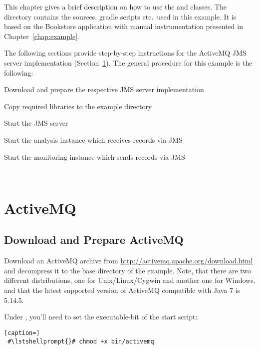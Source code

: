 This chapter gives a brief description on how to use the  and  %
classes. The directory \dir{\JMSBookstoreApplicationReleaseDirDistro/} contains the %
sources, gradle scripts etc.\ used in this example. It is based on the Bookstore %
application with manual instrumentation presented in Chapter~\ref{chap:example}. %

The following sections provide step-by-step instructions for the %
ActiveMQ JMS server implementation (Section~\ref{example:jms:activemq}).
The general procedure for this example is the following:

\medskip

\begin{compactenum}
 \item Download and prepare the respective JMS server implementation
 \item Copy required libraries to the example directory
 \item Start the JMS server
 \item Start the analysis instance which receives records via JMS
 \item Start the monitoring instance which sends records via JMS
\end{compactenum}

\


\section{ActiveMQ}\label{example:jms:activemq}

\subsection{Download and Prepare ActiveMQ}

Download an ActiveMQ archive from \url{http://activemq.apache.org/download.html}
and decompress it to the base directory of the example. Note, that there are two different %
distributions, one for Unix/Linux/Cygwin and another one for Windows, and that the latest supported version of ActiveMQ compatible with Java 7 is 5.14.5. 

Under \UnixLikeSystems{}, you'll need to set the executable-bit of the start script:

\setBashListing
\begin{lstlisting}[caption=]
 #\lstshellprompt{}# chmod +x bin/activemq
\end{lstlisting}

